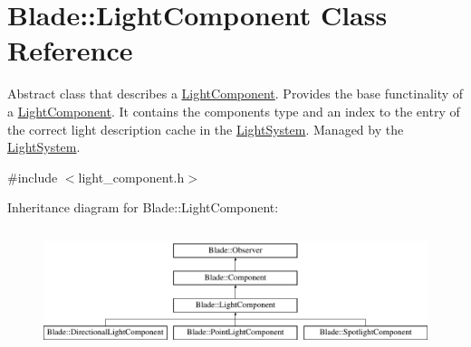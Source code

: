 \hypertarget{class_blade_1_1_light_component}{}\section{Blade\+:\+:Light\+Component Class Reference}
\label{class_blade_1_1_light_component}


Abstract class that describes a \hyperlink{class_blade_1_1_light_component}{Light\+Component}. Provides the base functinality of a \hyperlink{class_blade_1_1_light_component}{Light\+Component}. It contains the component\textquotesingle{}s type and an index to the entry of the correct light description cache in the \hyperlink{class_blade_1_1_light_system}{Light\+System}. Managed by the \hyperlink{class_blade_1_1_light_system}{Light\+System}.  




{\ttfamily \#include $<$light\+\_\+component.\+h$>$}

Inheritance diagram for Blade\+:\+:Light\+Component\+:\begin{figure}[H]
\begin{center}
\leavevmode
\includegraphics[height=3.572568cm]{class_blade_1_1_light_component}
\end{center}
\end{figure}
